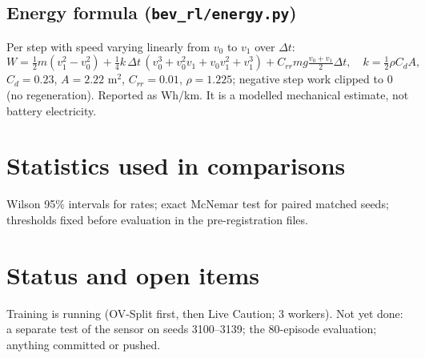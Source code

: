 \documentclass[11pt,a4paper]{article}
\begin{document}
\subsection{Energy formula (\texttt{bev\_rl/energy.py})}
Per step with speed varying linearly from $v_0$ to $v_1$ over $\Delta t$:
\[ W=\tfrac12 m(v_1^2-v_0^2)+\tfrac14 k\,\Delta t\,(v_0^3+v_0^2v_1+v_0v_1^2+v_1^3)+C_{rr}mg\tfrac{v_0+v_1}{2}\Delta t,\quad k=\tfrac12\rho C_dA,\]
$C_d=0.23$, $A=2.22$ m$^2$, $C_{rr}=0.01$, $\rho=1.225$; negative step work clipped to 0 (no regeneration). Reported as Wh/km. It is a modelled mechanical estimate, not battery electricity.

\section{Statistics used in comparisons}
Wilson 95\% intervals for rates; exact McNemar test for paired matched seeds; thresholds fixed before evaluation in the pre-registration files.

\section{Status and open items}
Training is running (OV-Split first, then Live Caution; 3 workers). Not yet done: a separate test of the sensor on seeds 3100--3139; the 80-episode evaluation; anything committed or pushed.
\end{document}
